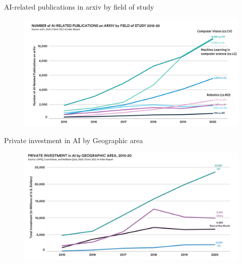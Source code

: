 {

\begin{frame}{AI-related publications in arxiv by field of study}

\begin{figure}
 \centering
 \includegraphics[width=1.0\textwidth]{./figures/progress-of-air-b/outputs/drawing-v00.png}
\end{figure}

\end{frame}
}



{

\begin{frame}{Private investment in AI by Geographic area}

\begin{figure}
 \centering
 \includegraphics[width=1.0\textwidth]{./figures/progress-of-air-c/outputs/drawing-v00.png}
\end{figure}

\end{frame}
}




